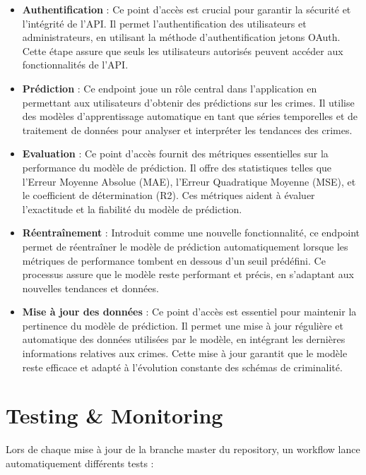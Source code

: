 \documentclass[12pt]{article}
\begin{document}
\begin{itemize}
	\item \textbf{Authentification} : Ce point d'accès est crucial pour garantir la sécurité et l'intégrité de l'API. Il permet l'authentification des utilisateurs et administrateurs, en utilisant la méthode d'authentification jetons OAuth. Cette étape assure que seuls les utilisateurs autorisés peuvent accéder aux fonctionnalités de l'API.
	\item \textbf{Prédiction} : Ce endpoint joue un rôle central dans l'application en permettant aux utilisateurs d'obtenir des prédictions sur les crimes. Il utilise des modèles d'apprentissage automatique en tant que séries temporelles et de traitement de données pour analyser et interpréter les tendances des crimes.
	\item \textbf{Evaluation} : Ce point d'accès fournit des métriques essentielles sur la performance du modèle de prédiction. Il offre des statistiques telles que l'Erreur Moyenne Absolue (MAE), l'Erreur Quadratique Moyenne (MSE), et le coefficient de détermination (R2). Ces métriques aident à évaluer l'exactitude et la fiabilité du modèle de prédiction.
	\item \textbf{Réentraînement} : Introduit comme une nouvelle fonctionnalité, ce endpoint permet de réentraîner le modèle de prédiction automatiquement lorsque les métriques de performance tombent en dessous d'un seuil prédéfini. Ce processus assure que le modèle reste performant et précis, en s'adaptant aux nouvelles tendances et données.
	\item \textbf{Mise à jour des données} : Ce point d'accès est essentiel pour maintenir la pertinence du modèle de prédiction. Il permet une mise à jour régulière et automatique des données utilisées par le modèle, en intégrant les dernières informations relatives aux crimes. Cette mise à jour garantit que le modèle reste efficace et adapté à l'évolution constante des schémas de criminalité.
\end{itemize}


\section{Testing \& Monitoring}

Lors de chaque mise à jour de la branche master du repository, un workflow lance automatiquement différents tests :
\end{document}
